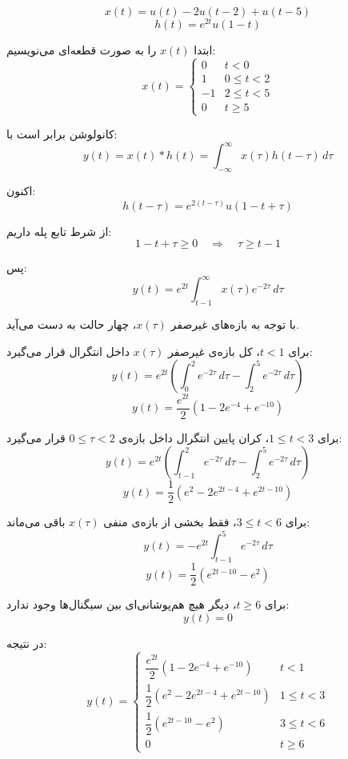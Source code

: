 \[
x(t)=u(t)-2u(t-2)+u(t-5)
\]
\[
h(t)=e^{2t}u(1-t)
\]

ابتدا \(x(t)\) را به صورت قطعه‌ای می‌نویسیم:
\[
x(t)=
\begin{cases}
0 & t<0\\
1 & 0\le t<2\\
-1 & 2\le t<5\\
0 & t\ge 5
\end{cases}
\]

کانولوشن برابر است با:
\[
y(t)=x(t)*h(t)=\int_{-\infty}^{\infty}x(\tau)h(t-\tau)\,d\tau
\]

اکنون:
\[
h(t-\tau)=e^{2(t-\tau)}u(1-t+\tau)
\]

از شرط تابع پله داریم:
\[
1-t+\tau \ge 0
\quad \Longrightarrow \quad
\tau \ge t-1
\]

پس:
\[
y(t)
=e^{2t}\int_{t-1}^{\infty}x(\tau)e^{-2\tau}\,d\tau
\]

با توجه به بازه‌های غیرصفر \(x(\tau)\)، چهار حالت به دست می‌آید.

برای \(t<1\)، کل بازه‌ی غیرصفر \(x(\tau)\) داخل انتگرال قرار می‌گیرد:
\[
y(t)
=e^{2t}
\left(
\int_{0}^{2}e^{-2\tau}\,d\tau
-
\int_{2}^{5}e^{-2\tau}\,d\tau
\right)
\]
\[
y(t)
=
\frac{e^{2t}}{2}
\left(
1-2e^{-4}+e^{-10}
\right)
\]

برای \(1\le t<3\)، کران پایین انتگرال داخل بازه‌ی \(0\le \tau<2\) قرار می‌گیرد:
\[
y(t)
=e^{2t}
\left(
\int_{t-1}^{2}e^{-2\tau}\,d\tau
-
\int_{2}^{5}e^{-2\tau}\,d\tau
\right)
\]
\[
y(t)
=
\frac{1}{2}
\left(
e^2-2e^{2t-4}+e^{2t-10}
\right)
\]

برای \(3\le t<6\)، فقط بخشی از بازه‌ی منفی \(x(\tau)\) باقی می‌ماند:
\[
y(t)
=
-e^{2t}
\int_{t-1}^{5}e^{-2\tau}\,d\tau
\]
\[
y(t)
=
\frac{1}{2}
\left(
e^{2t-10}-e^2
\right)
\]

برای \(t\ge 6\)، دیگر هیچ هم‌پوشانی‌ای بین سیگنال‌ها وجود ندارد:
\[
y(t)=0
\]

در نتیجه:
\[
\boxed{
y(t)=
\begin{cases}
\dfrac{e^{2t}}{2}\left(1-2e^{-4}+e^{-10}\right) & t<1\\[6pt]
\dfrac{1}{2}\left(e^2-2e^{2t-4}+e^{2t-10}\right) & 1\le t<3\\[6pt]
\dfrac{1}{2}\left(e^{2t-10}-e^2\right) & 3\le t<6\\[6pt]
0 & t\ge 6
\end{cases}
}
\]

